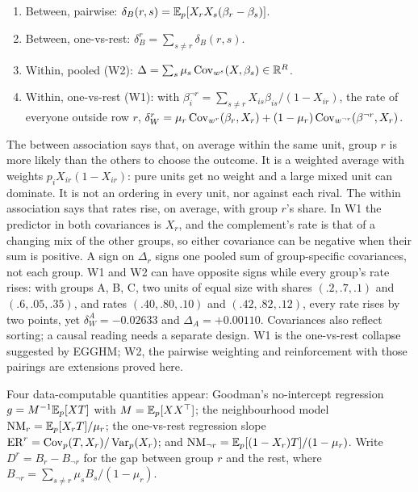 \begin{definition}[Associations]\label{def:assoc}
\begin{enumerate}[label=(\roman*)]
\item Between, pairwise: $\delta_B(r,s)=\mathbb E_p[X_rX_s(\beta_r-\beta_s)]$.
\item Between, one-vs-rest: $\delta^r_B=\sum_{s\ne r}\delta_B(r,s)$.
\item Within, pooled (W2): $\Delta=\sum_s\mu_s\operatorname{Cov}_{w^s}(X,\beta_s)\in\mathbb R^R$.
\item Within, one-vs-rest (W1): with
$\beta^{\neg r}_i=\sum_{s\ne r}X_{is}\beta_{is}/(1-X_{ir})$, the rate of everyone
outside row $r$,
$\delta^r_W=\mu_r\operatorname{Cov}_{w^r}(\beta_r,X_r)+(1-\mu_r)\operatorname{Cov}_{w^{\neg r}}(\beta^{\neg r},X_r)$.
\end{enumerate}
\end{definition}
\begin{reading}
The between association says that, on average within the same unit, group $r$
is more likely than the others to choose the outcome. It is a weighted average
with weights $p_iX_{ir}(1-X_{ir})$: pure units get no weight and a large mixed
unit can dominate. It is not an ordering in every unit, nor against each rival.
The within association says that rates rise, on average, with group $r$'s share.
In W1 the predictor in both covariances is $X_r$, and the complement's rate is
that of a changing mix of the other groups, so either covariance can be negative
when their sum is positive. A sign on $\Delta_r$ signs one pooled sum of
group-specific covariances, not each group. W1 and W2 can have opposite signs
while every group's rate rises: with groups A, B, C, two units of equal size with
shares $(.2,.7,.1)$ and $(.6,.05,.35)$, and rates $(.40,.80,.10)$ and
$(.42,.82,.12)$, every rate rises by two points, yet $\delta^A_W=-0.02633$ and
$\Delta_A=+0.00110$. Covariances also reflect sorting; a causal reading needs a
separate design. W1 is the one-vs-rest collapse suggested by EGGHM; W2, the
pairwise weighting and reinforcement with those pairings are extensions proved
here.
\end{reading}

Four data-computable quantities appear: Goodman's no-intercept regression
$g=M^{-1}\mathbb E_p[XT]$ with $M=\mathbb E_p[XX^\top]$; the neighbourhood model
$\mathrm{NM}_r=\mathbb E_p[X_rT]/\mu_r$; the one-vs-rest regression slope
$\mathrm{ER}^r=\operatorname{Cov}_p(T,X_r)/\operatorname{Var}_p(X_r)$; and $\mathrm{NM}_{\neg r}=\mathbb E_p[(1-X_r)T]/(1-\mu_r)$.
Write $D^r=B_r-B_{\neg r}$ for the gap between group $r$ and the rest, where
$B_{\neg r}=\sum_{s\ne r}\mu_sB_s/(1-\mu_r)$.

